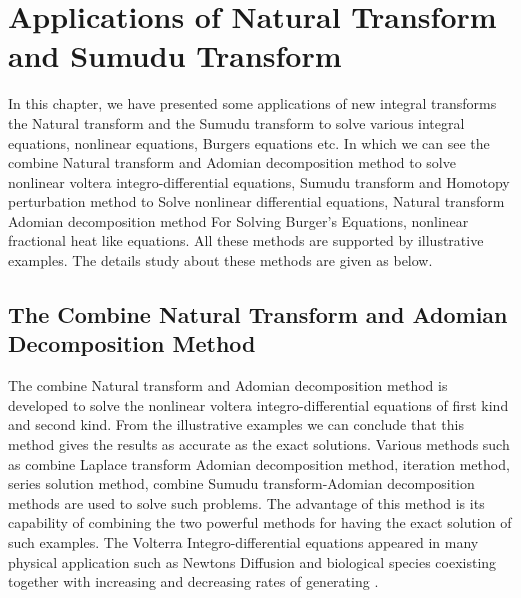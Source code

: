
\chapter{Applications of Natural Transform and Sumudu Transform}
In this chapter, we have presented some applications of new integral transforms the Natural transform and the Sumudu transform to solve various integral equations, nonlinear equations, Burgers equations etc. In which we can see the combine Natural transform and Adomian decomposition method to solve nonlinear voltera integro-differential equations, Sumudu transform and Homotopy perturbation method to Solve nonlinear differential equations, Natural transform Adomian decomposition method For Solving Burger's Equations, nonlinear fractional heat like equations. All these methods are supported by illustrative examples. The details study about these methods are given as below.
\section{The Combine Natural Transform and Adomian Decomposition Method}  
The combine Natural transform and Adomian decomposition method is developed to solve the nonlinear voltera integro-differential equations of first kind and second kind. From the illustrative examples we can conclude that this method gives the results as accurate as the exact solutions. Various methods such as combine Laplace transform Adomian decomposition method, iteration method, series solution method, combine Sumudu transform-Adomian decomposition methods are used to solve such problems. The advantage of this method is its capability of combining the two powerful methods for having the exact solution of such examples. The Volterra Integro-differential equations appeared in many physical application such as Newtons Diffusion and biological species coexisting together with increasing and decreasing rates of generating \cite{R92}.
